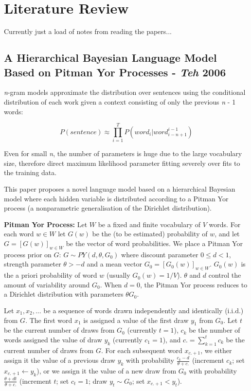 
\chapter{Literature Review}

Currently just a load of notes from reading the papers...

\section{A Hierarchical Bayesian Language Model Based on Pitman Yor Processes - \textit{Teh} 2006} \cite{teh2006hierarchical}

\textit{n}-gram models approximate the distribution over sentences using the conditional distribution of each work given a context consisting of only the previous \textit{n} - 1 words:

\begin{equation}
P(sentence)\approx\prod_{i=1}^{T}P(word_{i}|word_{i-n+1}^{i-1})
\label{eq:nGramModel}
\end{equation}

Even for small \textit{n}, the number of parameters is huge due to the large vocabulary size, therefore direct maximum likelihood parameter fitting severely over fits to the training data.

This paper proposes a novel language model based on a hierarchical Bayesian model where each hidden variable is distributed according to a Pitman Yor process (a nonparametric generalisation of the Dirichlet distribution).

\textbf{Pitman Yor Process:} Let $W$ be a fixed and finite vocabulary of $V$ words. For each word $w \in W$ let $G(w)$ be the (to be estimated) probability of $w$, and let $G = [G(w)]_{w\in W}$ be the vector of word probabilities. We place a Pitman Yor process prior on $G$: $G \sim PY(d, \theta, G_{0})$ where discount parameter $0\leq d <1$, strength parameter $\theta >-d$ and a mean vector $G_{0} = [G_{0}(w)]_{w\in W}$. $G_{0}(w)$ is the a priori probability of word $w$ (usually $G_{0}(w) = 1/V$). $\theta$ and $d$ control the amount of variability around $G_{0}$. When $d=0$, the Pitman Yor process reduces to a Dirichlet distribution with parameters $\theta G_{0}$.

Let $x_{1}, x_{2}, ...$ be a sequence of words drawn independently and identically (i.i.d.) from $G$. The first word $x_{1}$ is assigned a value of the first draw $y_{1}$ from $G_{0}$. Let $t$ be the current number of draws from $G_{0}$ (currently $t=1$), $c_{k}$ be the number of words assigned the value of draw $y_{k}$ (currently $c_{1}=1$), and $c.=\sum_{k=1}^{t}c_{k}$ be the current number of draws from $G$. For each subsequent word $x_{c.+1}$, we either assign it the value of a previous draw $y_{k}$ with probability $\frac{c_{k}-d}{\theta +c.}$ (increment $c_{k}$; set $x_{c.+1}\leftarrow y_{k}$), or we assign it the value of a new draw from $G_{0}$ with probability $\frac{\theta +dt}{\theta +c.}$ (increment $t$; set $c_{t}=1$; draw $y_{t}\sim G_{0}$; set $x_{c.+1}<y_{t}$).

